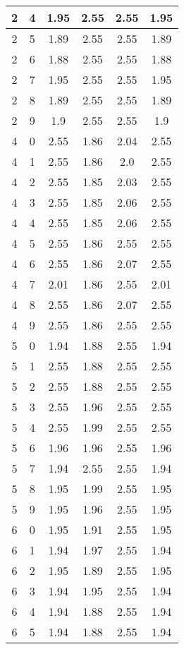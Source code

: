 \begin{longtable}{|c|c||c||c|c||c|}
	2 & 4 & 1.95 & 2.55 & 2.55 & 1.95 \\ \hline
	2 & 5 & 1.89 & 2.55 & 2.55 & 1.89 \\ \hline
	2 & 6 & 1.88 & 2.55 & 2.55 & 1.88 \\ \hline
	2 & 7 & 1.95 & 2.55 & 2.55 & 1.95 \\ \hline
	2 & 8 & 1.89 & 2.55 & 2.55 & 1.89 \\ \hline
	2 & 9 & 1.9 & 2.55 & 2.55 & 1.9 \\ \hline
	4 & 0 & 2.55 & 1.86 & 2.04 & 2.55 \\ \hline
	4 & 1 & 2.55 & 1.86 & 2.0 & 2.55 \\ \hline
	4 & 2 & 2.55 & 1.85 & 2.03 & 2.55 \\ \hline
	4 & 3 & 2.55 & 1.85 & 2.06 & 2.55 \\ \hline
	4 & 4 & 2.55 & 1.85 & 2.06 & 2.55 \\ \hline
	4 & 5 & 2.55 & 1.86 & 2.55 & 2.55 \\ \hline
	4 & 6 & 2.55 & 1.86 & 2.07 & 2.55 \\ \hline
	4 & 7 & 2.01 & 1.86 & 2.55 & 2.01 \\ \hline
	4 & 8 & 2.55 & 1.86 & 2.07 & 2.55 \\ \hline
	4 & 9 & 2.55 & 1.86 & 2.55 & 2.55 \\ \hline
	5 & 0 & 1.94 & 1.88 & 2.55 & 1.94 \\ \hline
	5 & 1 & 2.55 & 1.88 & 2.55 & 2.55 \\ \hline
	5 & 2 & 2.55 & 1.88 & 2.55 & 2.55 \\ \hline
	5 & 3 & 2.55 & 1.96 & 2.55 & 2.55 \\ \hline
	5 & 4 & 2.55 & 1.99 & 2.55 & 2.55 \\ \hline
	5 & 6 & 1.96 & 1.96 & 2.55 & 1.96 \\ \hline
	5 & 7 & 1.94 & 2.55 & 2.55 & 1.94 \\ \hline
	5 & 8 & 1.95 & 1.99 & 2.55 & 1.95 \\ \hline
	5 & 9 & 1.95 & 1.96 & 2.55 & 1.95 \\ \hline
	6 & 0 & 1.95 & 1.91 & 2.55 & 1.95 \\ \hline
	6 & 1 & 1.94 & 1.97 & 2.55 & 1.94 \\ \hline
	6 & 2 & 1.95 & 1.89 & 2.55 & 1.95 \\ \hline
	6 & 3 & 1.94 & 1.95 & 2.55 & 1.94 \\ \hline
	6 & 4 & 1.94 & 1.88 & 2.55 & 1.94 \\ \hline
	6 & 5 & 1.94 & 1.88 & 2.55 & 1.94 \\ \hline

\end{longtable}
